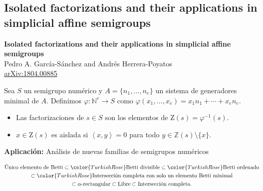 \documentclass[10pt,compress]{beamer}
\begin{document}
\subsection{Isolated factorizations and their applications in simplicial affine semigroups}

\begin{frame}
  \begin{tcolorbox}[colback=ChetwodeBlue!10,colframe=ChetwodeBlue!60]
    \begin{center}
      \vspace*{-1mm} {\color{TurkishRose}\textbf{Isolated factorizations and their applications in
          simplicial affine
          semigroups}} \\
      Pedro A. Garc\'ia-Sánchez and Andrés Herrera-Poyatos \\
      \href{https://arxiv.org/abs/arXiv:1804.00885}{arXiv:1804.00885}
    \end{center}
    \vspace*{-4mm}
  \end{tcolorbox}

  Sea $S$ un semigrupo numérico y $A = \{n_1, \ldots, n_e\}$ un sistema de generadores minimal de
  $A$. Definimos $\varphi \colon \mathbb{N}^e \to S$ como
  $\varphi(x_1, \ldots, x_e) = x_1 n_1 + \cdots + x_e n_e$.
  
  \begin{definition}
    \begin{itemize}
    \item Las factorizaciones de $s \in S$ son los elementos de $\mathrm{Z}(s) = \varphi^{-1}(s)$.
    \item $x \in \mathrm{Z}(s)$ es aislada si $\left\langle x, y \right\rangle = 0$ para todo
      $y \in \mathbb{Z}(s) \setminus \{x\}$.
    \end{itemize}
  \end{definition}

  \textbf{Aplicación:} Análisis de nuevas familias de semigrupos numéricos
    \vspace*{-4mm}
  
  \begin{gather*}
    \text{Único elemento de Betti} \subset {\color{TurkishRose}\text{Betti divisible}} \subset {\color{TurkishRose}\text{Betti ordenado}} \\
    \subset {\color{TurkishRose}\text{Intersección completa con solo un elemento Betti minimal}} \\
    \subset \alpha\text{-rectangular} \subset \text{Libre} \subset \text{Intersección completa}.
  \end{gather*}
\end{frame}
  
\end{document}
